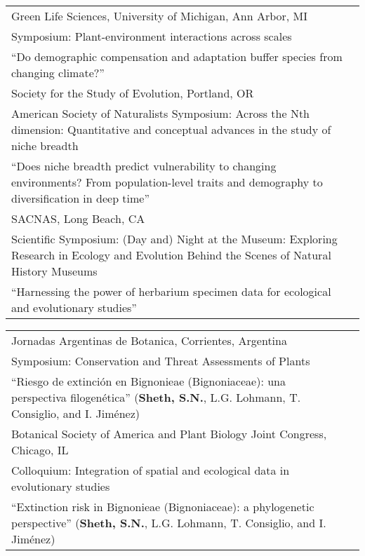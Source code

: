 \documentclass[11pt,english]{article}\usepackage[]{graphicx}\usepackage[]{xcolor}
\providecommand{\tabularnewline}{\\}
\begin{document}
\begin{tabularx}{\textwidth}{@{}>{\raggedright}p{5.25in}
>{\raggedleft}X@{}}
Green Life Sciences, University of Michigan, Ann Arbor, MI & 2018 \tabularnewline
\addtolength{\leftskip}{5ex} Symposium: Plant-environment interactions across scales  \tabularnewline
\addtolength{\leftskip}{5ex} ``Do demographic compensation and adaptation buffer species from changing climate?'' \tabularnewline

Society for the Study of Evolution, Portland, OR & 2017 \tabularnewline
\addtolength{\leftskip}{5ex} American Society of Naturalists Symposium: Across the Nth dimension: Quantitative and conceptual advances in the study of niche breadth  \tabularnewline
\addtolength{\leftskip}{5ex} ``Does niche breadth predict vulnerability to changing environments? From population-level traits and demography to diversification in deep time'' \tabularnewline

SACNAS, Long Beach, CA & 2016 \tabularnewline
\addtolength{\leftskip}{5ex} Scientific Symposium: (Day and) Night at the Museum: Exploring Research in Ecology and Evolution Behind the Scenes of Natural History Museums \tabularnewline
\addtolength{\leftskip}{5ex} ``Harnessing the power of herbarium specimen data for ecological and evolutionary studies'' \tabularnewline

\end{tabularx}

\renewcommand{\arraystretch}{1.2}
\begin{tabularx}{\textwidth}{@{}>{\raggedright}p{5.25in} >{\raggedleft}X@{}}

Jornadas Argentinas de Botanica, Corrientes, Argentina & 2007 \tabularnewline
\addtolength{\leftskip}{5ex} Symposium: Conservation and Threat Assessments of Plants \tabularnewline
\addtolength{\leftskip}{5ex} ``Riesgo de extinci\'on en Bignonieae (Bignoniaceae): una perspectiva filogen\'etica'' (\textbf{Sheth, S.N.}, L.G. Lohmann, T. Consiglio, and I. Jim\'enez) \tabularnewline

Botanical Society of America and Plant Biology Joint Congress, Chicago, IL & 2007 \tabularnewline
\addtolength{\leftskip}{5ex} \small{Colloquium: Integration of spatial and ecological data in evolutionary studies} \tabularnewline
\addtolength{\leftskip}{5ex} ``Extinction risk in Bignonieae (Bignoniaceae): a phylogenetic perspective'' (\textbf{Sheth, S.N.}, L.G. Lohmann, T. Consiglio, and I. Jim\'enez) \tabularnewline

\end{tabularx}
\vspace{-0.5ex}
\end{document}
